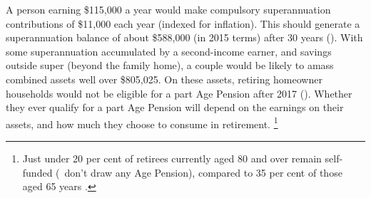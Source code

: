 A person earning \$115,000 a year would make compulsory superannuation contributions of \$11,000 each year (indexed for inflation). This should generate a superannuation balance of about \$588,000 (in 2015 terms\DEVIATION{}) after 30 years (). With some superannuation accumulated by a second-income earner, and savings outside super (beyond the family home), a couple would be likely to amass combined assets well over \$805,025. On these assets, retiring homeowner households would not be eligible for a part Age Pension after 2017 (). Whether they ever qualify for a part Age Pension will depend on the earnings on their assets, and how much they choose to consume in retirement.%
\footnote{Just under 20 per cent of retirees currently aged 80 and over remain self-funded (\ie~don’t draw any Age Pension), compared to 35 per cent of those aged 65 years 
\textcite[][47]{ActuariesInstitute2015RetirementIncomes}.} 

